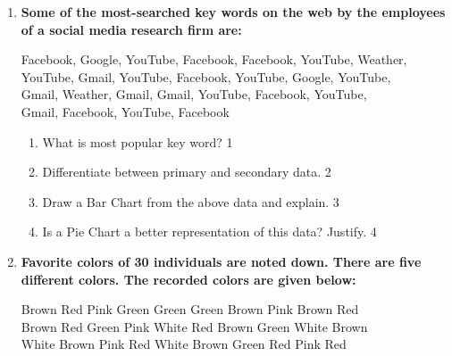 \documentclass[a4paper,oneside]{book}
\begin{document}
\begin{enumerate}
  \begin{enumerate}
    \item
	On which day do you see the highest number of accidents? \hfill 1
    \item
	Make a table of top 5 districts with highest number of accidents. \hfill 2
    \item  Make a Pie Chart using the table in (b). \hfill 3
    \item	Make a bar diagram showing the number of the districts affected daily, and interpret the trend.  \hfill 4
  \end{enumerate}
  
         \item
	  \textbf{Some of the most-searched key words on the web by the employees of a social media research firm are:}
	  
	  \begin{center}
    Facebook, Google, YouTube, Facebook, Facebook, YouTube, Weather, \\
YouTube, Gmail, YouTube, Facebook, YouTube, Google, YouTube, \\
Gmail, Weather, Gmail, Gmail, YouTube, Facebook, YouTube, \\
Gmail, Facebook, YouTube, Facebook
    \end{center}
    
  
  \begin{enumerate}
    \item What is most popular key word? \hfill 1
    \item Differentiate between primary and secondary data. \hfill 2
    \item  
	Draw a Bar Chart from the above data and explain. \hfill 3
    \item
	Is a Pie Chart a better representation of this data? Justify. \hfill 4
  \end{enumerate}
  
     \item
	  \textbf{Favorite colors of 30 individuals are noted down. There are five different colors. The recorded colors are given below:}
	  
	  \begin{centering}
	  Brown Red   Pink  Green Green Green Brown Pink  Brown Red   \\
    Brown Red   Green Pink  White Red   Brown Green White Brown \\
    White Brown Pink  Red   White Brown Green Red   Pink  Red  \\
    \end{centering}
    

\end{enumerate}
\end{document}

